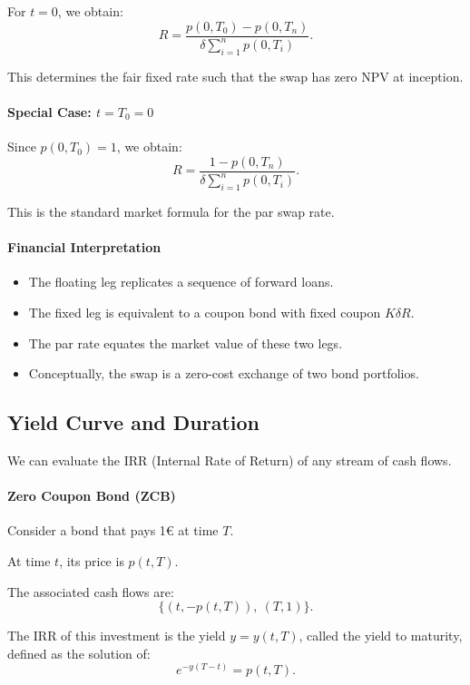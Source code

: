\documentclass[12pt,a4paper]{article}
\theoremstyle{definition}
\begin{document}
For $t = 0$, we obtain:
\[
R = \frac{p(0, T_0) - p(0, T_n)}{\delta \sum_{i=1}^n p(0, T_i)}.
\]

This determines the fair fixed rate such that the swap has zero NPV at inception.

\paragraph{Special Case: $t = T_0 = 0$}

Since $p(0, T_0) = 1$, we obtain:
\[
R = \frac{1 - p(0, T_n)}{\delta \sum_{i=1}^n p(0, T_i)}.
\]

This is the standard market formula for the par swap rate.

\paragraph{Financial Interpretation}

\begin{itemize}
\item The floating leg replicates a sequence of forward loans.

\item The fixed leg is equivalent to a coupon bond with fixed coupon $K\delta R$.

\item The par rate equates the market value of these two legs.

\item Conceptually, the swap is a zero-cost exchange of two bond portfolios.
\end{itemize}

\subsection{Yield Curve and Duration}

We can evaluate the IRR (Internal Rate of Return) of any stream of cash flows.

\paragraph{Zero Coupon Bond (ZCB)}

Consider a bond that pays 1€ at time $T$.

At time $t$, its price is $p(t, T)$.

The associated cash flows are:
\[
\{(t, -p(t, T)), \ (T, 1)\}.
\]

The IRR of this investment is the yield $y = y(t, T)$, called the yield to maturity, defined as the solution of:
\[
e^{-y(T - t)} = p(t, T).
\]
\end{document}
